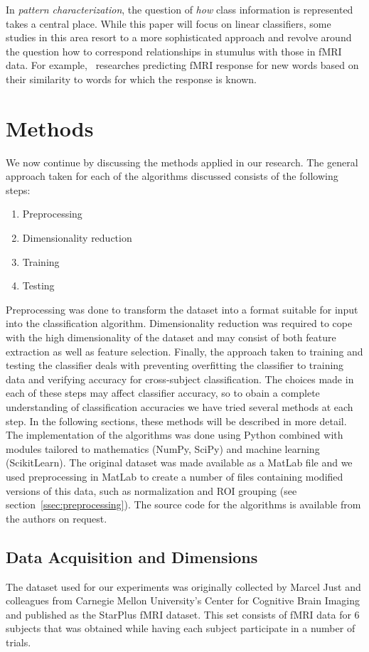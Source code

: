 \documentclass[preprint,journal,11pt]{vgtc}
\begin{document}
In \emph{pattern characterization}, the question of \emph{how} class information is represented takes a central place. While this paper will focus on linear classifiers, some studies in this area resort to a more sophisticated approach and revolve around the question how to correspond relationships in stumulus with those in fMRI data. For example,~\cite{mitchell2008predicting} researches predicting fMRI response for new words based on their similarity to words for which the response is known.


\section{Methods}
\label{sec:methods}
We now continue by discussing the methods applied in our research. The general approach taken for each of the algorithms discussed consists of the following steps:
\begin{enumerate}
  \item Preprocessing
  \item Dimensionality reduction
  \item Training
  \item Testing
\end{enumerate}
Preprocessing was done to transform the dataset into a format suitable for input into the classification algorithm. Dimensionality reduction was required to cope with the high dimensionality of the dataset and may consist of both feature extraction as well as feature selection. Finally, the approach taken to training and testing the classifier deals with preventing overfitting the classifier to training data and verifying accuracy for cross-subject classification. The choices made in each of these steps may affect classifier accuracy, so to obain a complete understanding of classification accuracies we have tried several methods at each step. In the following sections, these methods will be described in more detail.\\
The implementation of the algorithms was done using Python combined with modules tailored to mathematics (NumPy, SciPy) and machine learning (ScikitLearn). The original dataset was made available as a MatLab file and we used preprocessing in MatLab to create a number of files containing modified versions of this data, such as normalization and ROI grouping (see section~\ref{ssec:preprocessing}). The source code for the algorithms is available from the authors on request.

\subsection{Data Acquisition and Dimensions}
The dataset used for our experiments was originally collected by Marcel Just and colleagues from Carnegie Mellon University's Center for Cognitive Brain Imaging and published as the StarPlus fMRI dataset. This set consists of fMRI data for 6 subjects that was obtained while having each subject participate in a number of trials.
\end{document}
